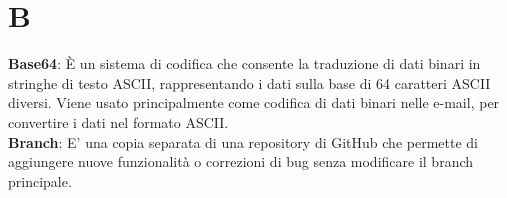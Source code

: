 \section{B}
\textbf{Base64}: È un sistema di codifica che consente la traduzione di dati binari in stringhe di testo ASCII, rappresentando i dati sulla base di 64 caratteri ASCII diversi. Viene usato principalmente come codifica di dati binari nelle e-mail, per convertire i dati nel formato ASCII.\\
\textbf{Branch}: E' una copia separata di una repository di GitHub che permette di aggiungere nuove funzionalità o correzioni di bug senza modificare il branch principale.\\
